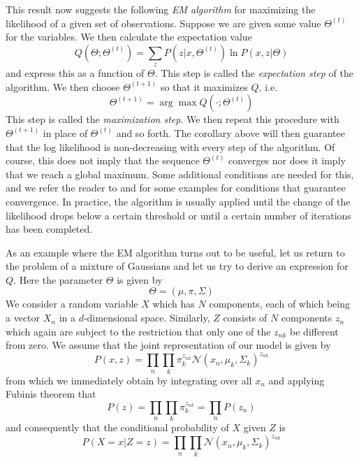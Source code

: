 \documentclass[a4paper, draft]{article}
\theoremstyle{own}
\theoremstyle{remark}
\begin{document}
This result now suggests the following  {\em EM algorithm} for maximizing the likelihood of a given set of observations. Suppose we are given some value $\Theta^{(t)}$ for the variables. We then calculate the expectation value
$$
Q(\Theta ; \Theta^{(t)}) = \sum_z  P(z | x, \Theta^{(t)}) \ln P(x,z | \Theta)  
$$
and express this as a function of $\Theta$. This step is called the {\em expectation step} of the algorithm. We then choose $\Theta^{(t+1)}$ so that it maximizes $Q$, i.e.
$$
\Theta^{(t+1)} =  \arg \max Q(\cdot ; \Theta^{(t)})
$$
This step is called the {\em maximization step}. We then repeat this procedure with $\Theta^{(t+1)}$ in place of $\Theta^{(t)}$ and so forth. The corollary above will then guarantee that the log likelihood is non-decreasing with every step of the algorithm. Of course, this does not imply that the sequence $\Theta^{(t)}$ converges nor does it imply that we reach a global maximum. Some additional conditions are needed for this, and we refer the reader to \cite{Dempster77} and \cite{RobertCasella1999} for some examples for conditions that guarantee convergence. In practice, the algorithm is usually applied until the change of the likelihood drops below a certain threshold or until a certain number of iterations has been completed.

	As an example where the EM algorithm turns out to be useful, let us return to the problem of a mixture of Gaussians and let us try to derive an expression for $Q$. Here the parameter $\Theta$ is given by 
	$$
	\Theta = (\mu, \pi, \Sigma)
	$$
	We consider a random variable $X$ which has $N$ components, each of which being a vector $X_n$ in a $d$-dimensional space. Similarly, $Z$ consists of $N$ components $z_n$ which again are subject to the restriction that only one of the $z_{nk}$ be different from zero. We assume that the joint representation of our model is given by
	$$
	P(x , z) = \prod_n \prod_k \pi_k^{z_{nk}}{\mathcal N} (x_n, \mu_k , \Sigma_k)^{z_{nk}}
	$$
from which we immediately obtain by integrating over all $x_n$ and applying Fubinis theorem that
$$
P(z) = \prod_n \prod_k \pi_k^{z_{nk}} = \prod_n P(z_n)
$$ and consequently that
the conditional probability of $X$ given $Z$ 
is 
$$
P(X = x | Z = z) = \prod_n \prod_k {\mathcal N} (x_n, \mu_k , \Sigma_k)^{z_{nk}}
$$
\end{document}
